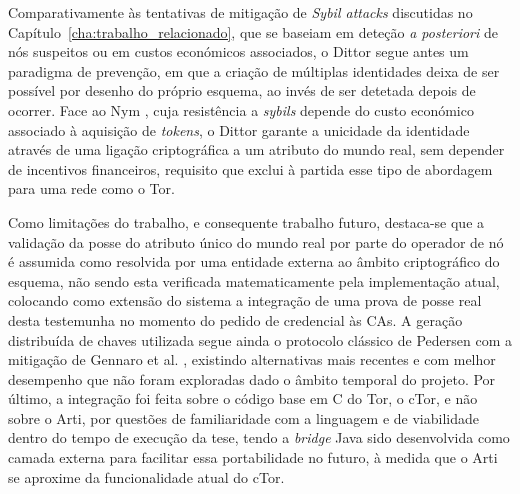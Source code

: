 Comparativamente às tentativas de mitigação de \textit{Sybil attacks} discutidas no Capítulo~\ref{cha:trabalho_relacionado}, que se baseiam em deteção \textit{a posteriori} de nós suspeitos ou em custos económicos associados, o Dittor segue antes um paradigma de prevenção, em que a criação de múltiplas identidades deixa de ser possível por desenho do próprio esquema, ao invés de ser detetada depois de ocorrer. Face ao Nym \cite{diaz2021nym, halpin2020nym}, cuja resistência a \textit{sybils} depende do custo económico associado à aquisição de \textit{tokens}, o Dittor garante a unicidade da identidade através de uma ligação criptográfica a um atributo do mundo real, sem depender de incentivos financeiros, requisito que exclui à partida esse tipo de abordagem para uma rede como o Tor.

Como limitações do trabalho, e consequente trabalho futuro, destaca-se que a validação da posse do atributo único do mundo real por parte do operador de nó é assumida como resolvida por uma entidade externa ao âmbito criptográfico do esquema, não sendo esta verificada matematicamente pela implementação atual, colocando como extensão do sistema a integração de uma prova de posse real desta testemunha no momento do pedido de credencial às CAs. A geração distribuída de chaves utilizada segue ainda o protocolo clássico de Pedersen com a mitigação de Gennaro et al. \cite{gennaro2007secure}, existindo alternativas mais recentes e com melhor desempenho que não foram exploradas dado o âmbito temporal do projeto. Por último, a integração foi feita sobre o código base em C do Tor, o cTor, e não sobre o Arti, por questões de familiaridade com a linguagem e de viabilidade dentro do tempo de execução da tese, tendo a \textit{bridge} Java sido desenvolvida como camada externa para facilitar essa portabilidade no futuro, à medida que o Arti se aproxime da funcionalidade atual do cTor.